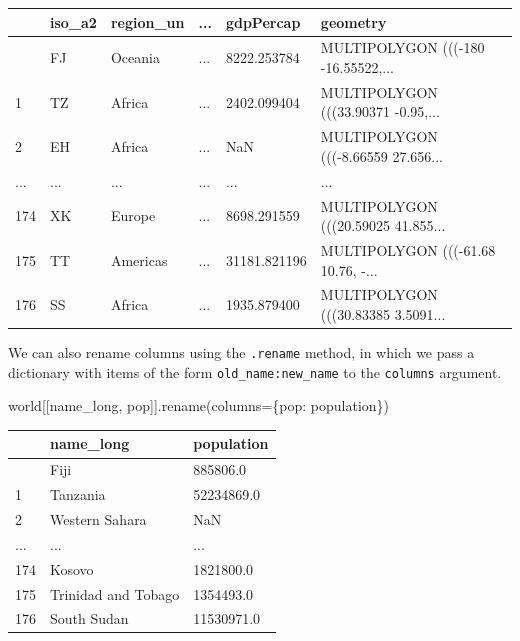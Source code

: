 \documentclass[
  letterpaper,
]{krantz}
\newenvironment{Shaded}{\begin{snugshade}}{\end{snugshade}}
\newcommand{\NormalTok}[1]{\textcolor[rgb]{0.00,0.23,0.31}{#1}}
\newcommand{\OperatorTok}[1]{\textcolor[rgb]{0.37,0.37,0.37}{#1}}
\newcommand{\StringTok}[1]{\textcolor[rgb]{0.13,0.47,0.30}{#1}}
\begin{document}
\begin{longtable}[]{@{}llllll@{}}
\toprule\noalign{}
& iso\_a2 & region\_un & ... & gdpPercap & geometry \\
\midrule\noalign{}
\endhead
\bottomrule\noalign{}
\endlastfoot
0 & FJ & Oceania & ... & 8222.253784 & MULTIPOLYGON (((-180
-16.55522,... \\
1 & TZ & Africa & ... & 2402.099404 & MULTIPOLYGON (((33.90371
-0.95,... \\
2 & EH & Africa & ... & NaN & MULTIPOLYGON (((-8.66559 27.656... \\
... & ... & ... & ... & ... & ... \\
174 & XK & Europe & ... & 8698.291559 & MULTIPOLYGON (((20.59025
41.855... \\
175 & TT & Americas & ... & 31181.821196 & MULTIPOLYGON (((-61.68 10.76,
-... \\
176 & SS & Africa & ... & 1935.879400 & MULTIPOLYGON (((30.83385
3.5091... \\
\end{longtable}

We can also rename columns using the \texttt{.rename} method, in which
we pass a dictionary with items of the form \texttt{old\_name:new\_name}
to the \texttt{columns} argument.

\begin{Shaded}
\begin{Highlighting}[]
\NormalTok{world[[}\StringTok{\textquotesingle{}name\_long\textquotesingle{}}\NormalTok{, }\StringTok{\textquotesingle{}pop\textquotesingle{}}\NormalTok{]].rename(columns}\OperatorTok{=}\NormalTok{\{}\StringTok{\textquotesingle{}pop\textquotesingle{}}\NormalTok{: }\StringTok{\textquotesingle{}population\textquotesingle{}}\NormalTok{\})}
\end{Highlighting}
\end{Shaded}

\begin{longtable}[]{@{}lll@{}}
\toprule\noalign{}
& name\_long & population \\
\midrule\noalign{}
\endhead
\bottomrule\noalign{}
\endlastfoot
0 & Fiji & 885806.0 \\
1 & Tanzania & 52234869.0 \\
2 & Western Sahara & NaN \\
... & ... & ... \\
174 & Kosovo & 1821800.0 \\
175 & Trinidad and Tobago & 1354493.0 \\
176 & South Sudan & 11530971.0 \\
\end{longtable}
\end{document}
